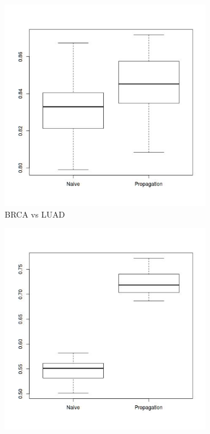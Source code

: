 \documentclass[a4paper]{article}
\begin{document}
\begin{figure} [h]
\begin{subfigure}[b]{0.45\textwidth}
	\includegraphics[width=\textwidth]{figures/BRCA_LUAD.jpg}
	\caption{BRCA vs LUAD}
\end{subfigure}
\begin{subfigure}[b]{0.45\textwidth}
	\includegraphics[width=\textwidth]{figures/BRCA_PRAD.jpg}

\end{subfigure}
\end{figure}
\end{document}
